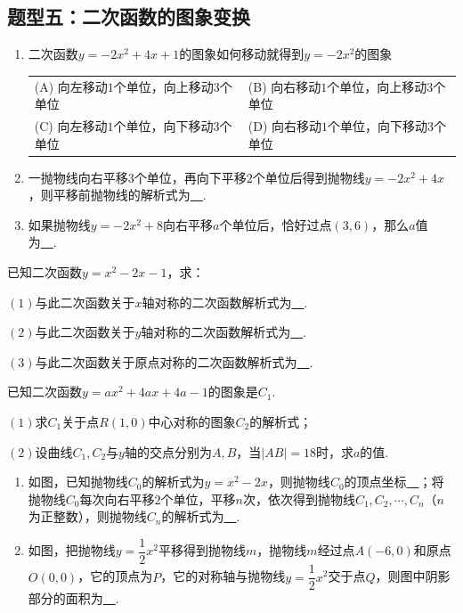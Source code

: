 \documentclass[10pt]{ctexart}
\newcommand{\abs}[1]{\left| #1 \right|}
\newcommand{\twoch}[4]{
\renewcommand\arraystretch{1.4}
\begin{tabularx}{\linewidth}{XX}
\setlength\tabcolsep{0pt}
(A) #1 & (B) #2 \\
(C) #3 & (D) #4
\end{tabularx}
\unskip \unskip}
\begin{document}
\subsection{题型五：二次函数的图象变换}
\begin{dkyi}{}{}
  \begin{enumerate}[(1)]
  \item 二次函数$y=-2x^2+4x+1$的图象如何移动就得到$y=-2x^2$的图象
  
  \twoch{向左移动$1$个单位，向上移动$3$个单位}{向右移动$1$个单位，向上移动$3$个单位}{向左移动$1$个单位，向下移动$3$个单位}{向右移动$1$个单位，向下移动$3$个单位}
  \item 一抛物线向右平移$3$个单位，再向下平移$2$个单位后得到抛物线$y=-2x^2+4x$，则平移前抛物线的解析式为\underline{~\hspace{1cm}~}.
  \item 如果抛物线$y=-2x^2+8$向右平移$a$个单位后，恰好过点$(3,6)$，那么$a$值为\underline{~\hspace{1cm}~}.
  \end{enumerate}
\end{dkyi}
\begin{dkyi}{}{}
已知二次函数$y=x^2-2x-1$，求：

$(1)$与此二次函数关于$x$轴对称的二次函数解析式为\underline{~\hspace{1cm}~}.

$(2)$与此二次函数关于$y$轴对称的二次函数解析式为\underline{~\hspace{1cm}~}.

$(3)$与此二次函数关于原点对称的二次函数解析式为\underline{~\hspace{1cm}~}.
\end{dkyi}
\begin{dkyi}{}{}
 已知二次函数$y=ax^2+4ax+4a-1$的图象是$C_1$.
 
 $(1)$求$C_1$关于点$R(1,0)$中心对称的图象$C_2$的解析式；
 
 $(2)$设曲线$C_1,C_2$与$y$轴的交点分别为$A,B$，当$\abs{AB}=18$时，求$a$的值.
\end{dkyi}
\begin{jply}{}{}
   \begin{enumerate}[(1)]
   \item 如图，已知抛物线$C_0$的解析式为$y=x^2-2x$，则抛物线$C_0$的顶点坐标\underline{~\hspace{1cm}~}；将抛物线$C_0$每次向右平移$2$个单位，平移$n$次，依次得到抛物线$C_1,C_2,\cdots,C_n$（$n$为正整数），则抛物线$C_n$的解析式为\underline{~\hspace{1cm}~}.
   \item 如图，把抛物线$y=\dfrac{1}{2}x^2$平移得到抛物线$m$，抛物线$m$经过点$A(-6,0)$和原点$O(0,0)$，它的顶点为$P$，它的对称轴与抛物线$y=\dfrac{1}{2}x^2$交于点$Q$，则图中阴影部分的面积为\underline{~\hspace{1cm}~}.
   \end{enumerate}
\end{jply}
\end{document}

